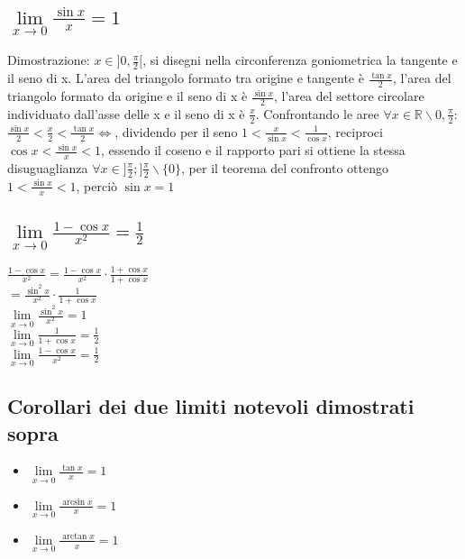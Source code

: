 \subsection{$\lim\limits_{x\rightarrow 0} \frac{\sin x}{x}=1$}
Dimostrazione: $x\in ]0,\frac{\pi}{2}[$, si disegni nella circonferenza goniometrica la tangente e il seno di x. L'area del triangolo formato tra origine e tangente \`e
 $\frac{\tan x}{2}$, l'area del triangolo formato da origine e il seno di x \`e $\frac{\sin x}{2}$, l'area del settore circolare individuato dall'asse delle x e il seno di x
 \`e $\frac{x}{2}$. Confrontando le aree $\forall x\in \mathbb{R}\backslash 0,\frac{\pi}{2}$: $\frac{\sin x}{2}<\frac{x}{2}<\frac{\tan x}{2}\Leftrightarrow$, dividendo per il seno 
 $1<\frac{x}{\sin x}<\frac{1}{\cos x}$, reciproci $\cos x<\frac{\sin x}{x}<1$, essendo il coseno e il rapporto pari si ottiene la stessa disuguaglianza $\forall x\in ]\frac{\pi}{2};]\frac{\pi}{2}\backslash\{0\}$, per il teorema del confronto ottengo $1<\frac{\sin x}{x}<1$, perci\`o $\sin x=1$
\subsection{$\lim\limits_{x\rightarrow 0} \frac{1-\cos x}{x^2}=\frac{1}{2}$}
$\frac{1-\cos x}{x^2}=\frac{1-\cos x}{x^2}\cdot\frac{1+\cos x}{1+\cos x}$\\
$=\frac{\sin^2 x}{x^2}\cdot\frac{1}{1+\cos x}$\\
$\lim\limits_{x\rightarrow 0}\frac{\sin^2 x}{x^2}=1$\\
$\lim\limits_{x\rightarrow 0}\frac{1}{1+\cos x}=\frac{1}{2}$\\
$\lim\limits_{x\rightarrow 0} \frac{1-\cos x}{x^2}=\frac{1}{2}$
\subsection{Corollari dei due limiti notevoli dimostrati sopra}
\begin{itemize}
\item $\lim\limits_{x\rightarrow 0} \frac{\tan x}{x}=1$
\item $\lim\limits_{x\rightarrow 0} \frac{\arcsin x}{x}=1$
\item $\lim\limits_{x\rightarrow 0} \frac{\arctan x}{x}=1$
\end{itemize}